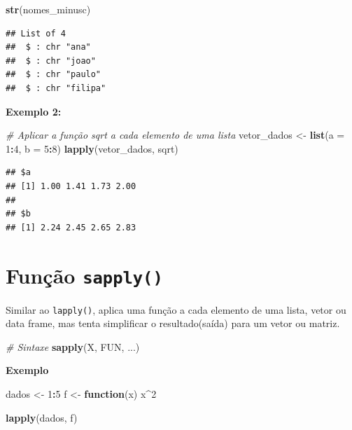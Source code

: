 \documentclass[
]{book}
\newenvironment{Shaded}{\begin{snugshade}}{\end{snugshade}}
\newcommand{\AttributeTok}[1]{\textcolor[rgb]{0.13,0.29,0.53}{#1}}
\newcommand{\CommentTok}[1]{\textcolor[rgb]{0.56,0.35,0.01}{\textit{#1}}}
\newcommand{\ControlFlowTok}[1]{\textcolor[rgb]{0.13,0.29,0.53}{\textbf{#1}}}
\newcommand{\DecValTok}[1]{\textcolor[rgb]{0.00,0.00,0.81}{#1}}
\newcommand{\FunctionTok}[1]{\textcolor[rgb]{0.13,0.29,0.53}{\textbf{#1}}}
\newcommand{\NormalTok}[1]{#1}
\newcommand{\OtherTok}[1]{\textcolor[rgb]{0.56,0.35,0.01}{#1}}
\newcommand{\SpecialCharTok}[1]{\textcolor[rgb]{0.81,0.36,0.00}{\textbf{#1}}}
\begin{document}
\begin{Shaded}
\begin{Highlighting}[]
\FunctionTok{str}\NormalTok{(nomes\_minusc) }
\end{Highlighting}
\end{Shaded}

\begin{verbatim}
## List of 4
##  $ : chr "ana"
##  $ : chr "joao"
##  $ : chr "paulo"
##  $ : chr "filipa"
\end{verbatim}

\textbf{Exemplo 2:}

\begin{Shaded}
\begin{Highlighting}[]
\CommentTok{\# Aplicar a função sqrt a cada elemento de uma lista}
\NormalTok{vetor\_dados }\OtherTok{\textless{}{-}} \FunctionTok{list}\NormalTok{(}\AttributeTok{a =} \DecValTok{1}\SpecialCharTok{:}\DecValTok{4}\NormalTok{, }\AttributeTok{b =} \DecValTok{5}\SpecialCharTok{:}\DecValTok{8}\NormalTok{)}
\FunctionTok{lapply}\NormalTok{(vetor\_dados, sqrt)}
\end{Highlighting}
\end{Shaded}

\begin{verbatim}
## $a
## [1] 1.00 1.41 1.73 2.00
## 
## $b
## [1] 2.24 2.45 2.65 2.83
\end{verbatim}

\section{\texorpdfstring{Função \texttt{sapply()}}{Função sapply()}}\label{funuxe7uxe3o-sapply}

Similar ao \texttt{lapply()}, aplica uma função a cada elemento de uma lista, vetor ou data frame, mas tenta simplificar o resultado(saída) para um vetor ou matriz.

\begin{Shaded}
\begin{Highlighting}[]
\CommentTok{\# Sintaxe}
\FunctionTok{sapply}\NormalTok{(X, FUN, ...)}
\end{Highlighting}
\end{Shaded}

\textbf{Exemplo}

\begin{Shaded}
\begin{Highlighting}[]
\NormalTok{dados }\OtherTok{\textless{}{-}} \DecValTok{1}\SpecialCharTok{:}\DecValTok{5}
\NormalTok{f }\OtherTok{\textless{}{-}} \ControlFlowTok{function}\NormalTok{(x) x}\SpecialCharTok{\^{}}\DecValTok{2}

\FunctionTok{lapply}\NormalTok{(dados, f)}
\end{Highlighting}
\end{Shaded}
\end{document}
